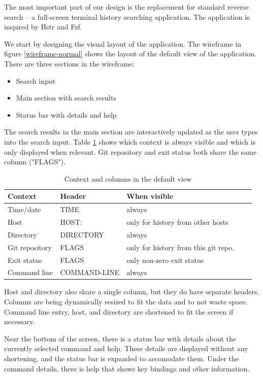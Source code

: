The most important part of our design is the replacement for standard reverse search -- a full-screen terminal history searching application. The application is inspired by Hstr and Fzf. 

We start by designing the visual layout of the application.
The wireframe in figure \ref{wireframe-normal} shows the layout of the default view of the application. There are three sections in the wireframe:

\begin{itemize}
\item Search input
\item Main section with search results
\item Status bar with details and help
\end{itemize}




The search results in the main section are interactively updated as the user types into the search input. Table \ref{tab:design-columns} shows which context is always visible and which is only displayed when relevant. Git repository and exit status both share the same column ("FLAGS"). 

\begin{table}[h]
\centering
\begin{tabular}{lllll}
\hline \hline
Context & Header & When visible \\\hline
Time/date & TIME & always \\ 
Host & HOST: & only for history from other hosts \\ 
Directory & DIRECTORY & always \\ 
Git repository & FLAGS & only for history from this git repo. \\ 
Exit status & FLAGS & only non-zero exit status \\ 
Command line & COMMAND-LINE & always \\\hline \hline
\end{tabular}
\caption{Context and columns in the default view}
\label{tab:design-columns}
\end{table}

Host and directory also share a single column, but they do have separate headers. Columns are being dynamically resized to fit the data and to not waste space. Command line entry, host, and directory are shortened to fit the screen if necessary. 

Near the bottom of the screen, there is a status bar with details about the currently selected command and help. These details are displayed without any shortening, and the status bar is expanded to accomodate them. Under the command details, there is help that shows key bindings and other information.


